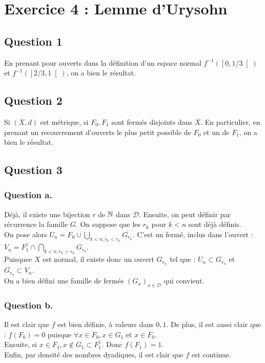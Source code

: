 \documentclass{cours}
\begin{document}
\section{Exercice 4 : Lemme d'Urysohn}
    \subsection{Question 1}
        En prenant pour ouverts dans la définition d'un espace normal $f^{-1}\left(\left[0, 1/3\right[\right)$ et $f^{-1}\left(\left[2/3, 1\right[\right)$, on a bien le résultat. 

    \subsection{Question 2}
        Si $(X, d)$ est métrique, si $F_{0}, F_{1}$ sont fermés disjoints dans $X$. En particulier, en prenant un recouvrement d'ouverts le plus petit possible de $F_0$ et un de $F_{1}$, on a bien le résultat.
    
    \subsection{Question 3}
        \subsubsection{Question a.}
            Déjà, il existe une bijection $r$ de $\mathbb{N}$ dans $\mathcal{D}$. Ensuite, on peut définir par récurrence la famille $G$. On suppose que les $r_{k}$ pour $k < n$ sont déjà définis. \\
            On pose alors $U_{n} = F_{0} \cup \bigcup\limits_{k < n, r_{k} < r_{n}} \overline{G_{r_{k}}}$. C'est un fermé, inclus dans l'ouvert : $V_{n} = F_{1}^{\complement} \cap \bigcap\limits_{k < n, r_{k} > r_{n}} G_{r_{k}}$.\\
            Puisquee $X$ est normal, il existe donc un ouvert $G_{r_{n}}$ tel que : $U_{n} \subset G_{r_{n}}$ et $ \overline{G_{r_{n}}} \subset V_{n}$.\\
            On a bien défini une famille de fermés $\left(G_{x}\right)_{x \in \mathcal{D}}$ qui convient. 
        
        \subsubsection{Question b.}
            Il est clair que $f$ est bien définie, à valeurs dans ${0, 1}$. 
            De plus, il est aussi clair que : $f\left(F_{0}\right) = 0$ puisque $\forall x \in F_{0}, x \in G_{1}$ et $x \in F_{0}$.\\
            Ensuite, si $x \in F_{1}, x \notin G_{1} \subset F_{1}^{\complement}$. Donc $f\left(F_{1}\right) = 1$.\\
            Enfin, par densité des nombres dyadiques, il est clair que $f$ est continue. 
\end{document}
